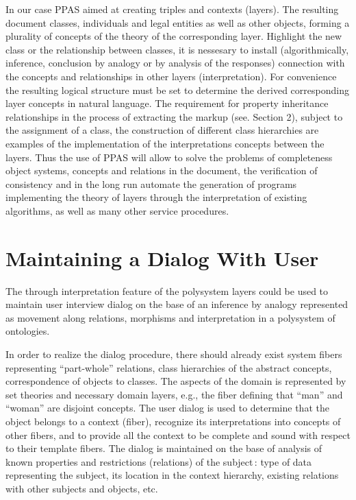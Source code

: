 \documentclass[conference]{IEEEtran}
\begin{document}
	In our case PPAS aimed at creating triples and contexts (layers). The resulting document classes, individuals and legal entities as well as other objects, forming a plurality of concepts of the theory of the corresponding layer. Highlight the new class or the relationship between classes, it is nessesary to install (algorithmically, inference, conclusion by analogy or by analysis of the responses) connection with the concepts and relationships in other layers (interpretation). For convenience the resulting logical structure must be set to determine the derived corresponding layer concepts in natural language. The requirement for property inheritance relationships in the process of extracting the markup (see. Section 2), subject to the assignment of a class, the construction of different class hierarchies are examples of the implementation of the interpretations concepts between the layers.
	Thus the use of PPAS will allow to solve the problems of completeness object systems, concepts and relations in the document, the verification of consistency and in the long run automate the generation of programs implementing the theory of layers through the interpretation of existing algorithms, as well as many other service procedures.

\section{Maintaining a Dialog With User}

The through interpretation feature of the polysystem layers could be
used to maintain user interview dialog on the base of an inference by
analogy represented as movement along relations, morphisms and
interpretation in a polysystem of ontologies.

In order to realize the dialog procedure, there should already exist
system fibers representing ``part-whole'' relations, class hierarchies
of the abstract concepts, correspondence of objects to classes.  The
aspects of the domain is represented by set theories and necessary
domain layers, e.g., the fiber defining that ``man'' and ``woman'' are
disjoint concepts.  The user dialog is used to determine that the
object belongs to a context (fiber), recognize its interpretations
into concepts of other fibers, and to provide all the context to be
complete and sound with respect to their template fibers.  The dialog
is maintained on the base of analysis of known properties and
restrictions (relations) of the subject\,: type of data representing
the subject, its location in the context hierarchy, existing relations
with other subjects and objects, etc.
\end{document}
